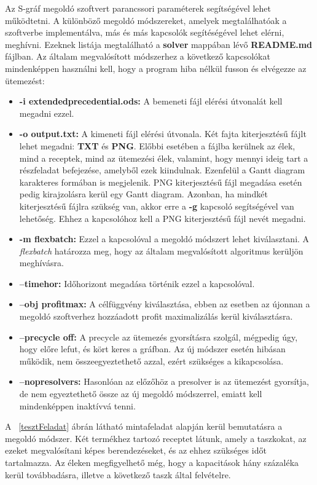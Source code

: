 Az S-gráf megoldó szoftvert parancssori paraméterek segítségével lehet működtetni.
A különböző megoldó módszereket, amelyek megtalálhatóak a szoftverbe implementálva, más és más kapcsolók segítéségével lehet elérni, meghívni.
Ezeknek listája megtalálható a \textbf{solver} mappában lévő \textbf{README.md} fájlban.
Az általam megvalósított módszerhez a következő kapcsolókat mindenképpen használni kell, hogy a program hiba nélkül fusson és elvégezze az ütemezést:
\begin{itemize}
	\item \textbf{-i extended\textunderscore precedential.ods:} A bemeneti fájl elérési útvonalát kell megadni ezzel.
	\item \textbf{-o output.txt:} A kimeneti fájl elérési útvonala.
	Két fajta kiterjesztésű fájlt lehet megadni: \textbf{TXT} és \textbf{PNG}.
	Előbbi esetében a fájlba kerülnek az élek, mind a receptek, mind az ütemezési élek, valamint, hogy mennyi ideig tart a részfeladat befejezése, amelyből ezek kiindulnak.
	Ezenfelül a Gantt diagram karakteres formában is megjelenik.
	PNG kiterjesztésű fájl megadása esetén pedig kirajzolásra kerül egy Gantt diagram.
	Azonban, ha mindkét kiterjesztésű fájlra szükség van, akkor erre a \textbf{-g} kapcsoló segítségével van lehetőség.
	Ehhez a kapcsolóhoz kell a PNG kiterjesztésű fájl nevét megadni.
	\item \textbf{-m flexbatch:} Ezzel a kapcsolóval a megoldó módszert lehet kiválasztani.
	A \textit{flexbatch} határozza meg, hogy az általam megvalósított algoritmus kerüljön meghívásra.
	\item \textbf{--timehor:} Időhorizont megadása történik ezzel a kapcsolóval.
	\item \textbf{--obj profit\textunderscore max:} A célfüggvény kiválasztása, ebben az esetben az újonnan a megoldó szoftverhez hozzáadott profit maximalizálás kerül kiválasztásra.
	\item \textbf{--precycle off:} A precycle az ütemezés gyorsításra szolgál, mégpedig úgy, hogy előre lefut, és kört keres a gráfban.
	Az új módszer esetén hibásan működik, nem összeegyeztethető azzal, ezért szükséges a kikapcsolása.
	\item \textbf{--nopresolvers:} Hasonlóan az előzőhöz a presolver is az ütemezést gyorsítja, de nem egyeztethető össze az új megoldó módszerrel, emiatt kell mindenképpen inaktívvá tenni.
\end{itemize}

A ~\ref{tesztFeladat} ábrán látható mintafeladat alapján kerül bemutatásra a megoldó módszer.
Két termékhez tartozó receptet látunk, amely a taszkokat, az ezeket megvalósítani képes berendezéseket, és az ehhez szükséges időt tartalmazza.
Az éleken megfigyelhető még, hogy a kapacitások hány százaléka kerül továbbadásra, illetve a következő taszk által felvételre.

